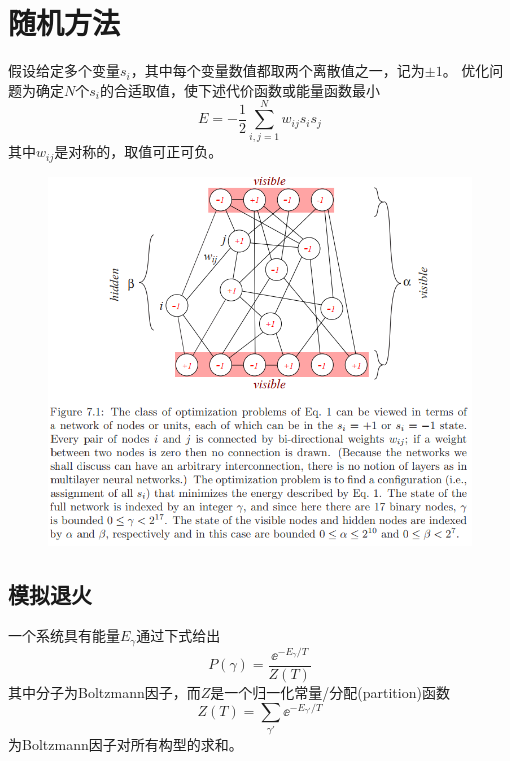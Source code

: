 
\section{随机方法} %
假设给定多个变量$s_i$，其中每个变量数值都取两个离散值之一，记为$\pm 1$。
优化问题为确定$N$个$s_i$的合适取值，使下述代价函数或能量函数最小
\[E=-\frac{1}{2}\sum_{i,j=1}^N w_{ij}s_is_j\]
其中$w_{ij}$是对称的，取值可正可负。
\begin{figure}[H]
\centering
\includegraphics[width=0.9\linewidth]{fig/stochastic_opt_problem.png}
\end{figure}

\subsection{模拟退火} %
一个系统具有能量$E_\gamma$通过下式给出
\[P(\gamma)=\frac{\ee^{-E_\gamma/T}}{Z(T)}\]
其中分子为Boltzmann因子，而$Z$是一个归一化常量/分配(partition)函数
\[Z(T)=\sum_{\gamma'}\ee^{-E_{\gamma'}/T}\]
为Boltzmann因子对所有构型的求和。

